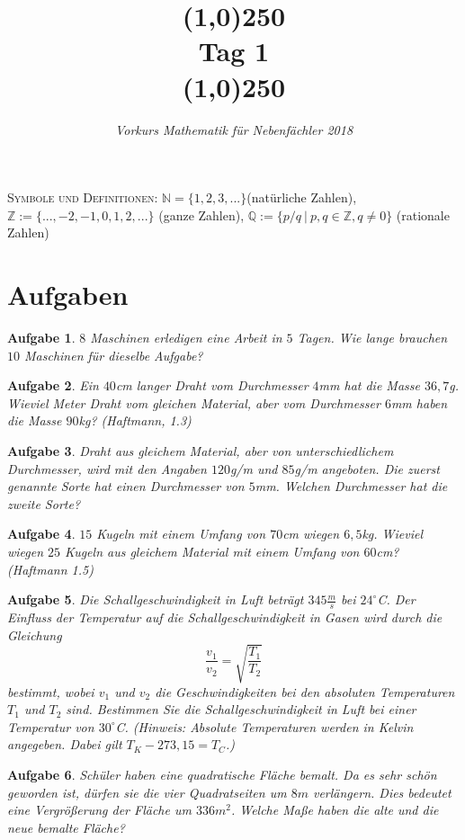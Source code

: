 \documentclass[11pt]{article}
\theoremstyle{generalpurposedef}
\newtheorem{task}{Aufgabe}
\theoremstyle{generalpurposetsk}
\begin{document}
\title{\line(1,0){250}\\Tag 1\\\line(1,0){250}}
\date{}
\author{\itshape Vorkurs Mathematik für Nebenfächler 2018}
\maketitle
\begin{framed}
	\noindent \scriptsize
	\textsc{Symbole und Definitionen:} $\mathbb{N} = \{1,2,3,...\}$(natürliche Zahlen), $\mathbb{Z}:= \{...,-2,-1,0,1,2,...\}$ (ganze Zahlen), $\mathbb{Q} := \{p/q~|~p,q\in \mathbb{Z},q\neq 0\}$ (rationale Zahlen)
\end{framed}
\section*{Aufgaben}
\begin{task}
	$8$ Maschinen erledigen eine Arbeit in $5$ Tagen. Wie lange brauchen $10$ Maschinen f\"ur dieselbe Aufgabe?
\end{task}
\begin{task}
	Ein $40$cm langer Draht vom Durchmesser $4$mm hat die Masse $36,7$g. Wieviel Meter Draht vom gleichen Material, aber vom Durchmesser $6$mm haben die Masse $90$kg? (Haftmann, 1.3)
\end{task}
\begin{task}
	Draht aus gleichem Material, aber von unterschiedlichem Durchmesser, wird mit den Angaben $120$g/m und $85$g/m angeboten. Die zuerst genannte Sorte hat einen Durchmesser von $5$mm. Welchen Durchmesser hat die zweite Sorte?
\end{task}
\begin{task}
	$15$ Kugeln mit einem Umfang von $70$cm wiegen $6,5$kg. Wieviel wiegen $25$ Kugeln aus gleichem Material mit einem Umfang von $60$cm? (Haftmann 1.5)
\end{task}
\begin{task}
	Die Schallgeschwindigkeit in Luft betr\"agt $345 \frac{m}{s}$ bei $24^\circ$C. Der Einfluss der Temperatur auf die Schallgeschwindigkeit in Gasen wird durch die Gleichung
	\[
	\frac{v_1}{v_2}=\sqrt{\frac{T_1}{T_2}}
	\]
	bestimmt, wobei $v_1$ und $v_2$ die Geschwindigkeiten bei den absoluten Temperaturen $T_1$ und $T_2$ sind. Bestimmen Sie die Schallgeschwindigkeit in Luft bei einer Temperatur von $30^\circ$C. (Hinweis: Absolute Temperaturen werden in Kelvin angegeben. Dabei gilt $T_K-273,15=T_C$.)
\end{task}
\dotfill
\begin{task}
Sch\"uler haben eine quadratische Fl\"ache bemalt. Da es sehr sch\"on geworden ist, d\"urfen sie die vier Quadratseiten um $8m$ verl\"angern. Dies bedeutet eine Vergr\"o\ss erung der Fl\"ache um $336m^2$. Welche Ma\ss e haben die alte und die neue bemalte Fl\"ache?
\end{task}
\end{document}
